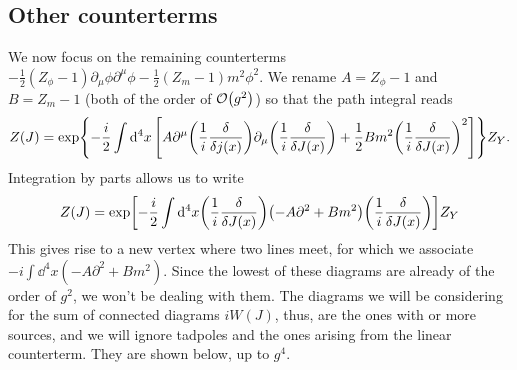 \subsection{Other counterterms}
We now focus on the remaining counterterms $-\frac{1}{2}(Z_\phi -1)\partial_\mu\phi\partial^\mu\phi-\frac{1}{2}(Z_m-1)m^2\phi^2$. We rename $A=Z_\phi-1$ and $B=Z_m-1$ (both of the order of $\order{g^2}$) so that the path integral reads
\begin{equation}
    Z(J)=\exp{-\frac{i}{2}\int\dd^4x\,\qty[A\partial^\mu\qty(\frac{1}{i}\fdv{j(x)})\partial_\mu\qty(\frac{1}{i}\fdv{J(x)})+\frac{1}{2}Bm^2\qty(\frac{1}{i}\fdv{J(x)})^2]}Z_Y.
\end{equation}
Integration by parts allows us to write
\begin{equation}
    Z(J)=\exp[-\frac{i}{2}\int\dd^4x\qty(\frac{1}{i}\fdv{J(x)})\qty(-A\partial^2+Bm^2)\qty(\frac{1}{i}\fdv{J(x)})]Z_Y
\end{equation}
This gives rise to a new vertex where two lines meet, for which we associate $-i\int\dd^4x(-A\partial^2+Bm^2)$. Since the lowest of these diagrams are already of the order of $g^2$, we won't be dealing with them. The diagrams we will be considering for the sum of connected diagrams $iW(J)$, thus, are the ones with or more sources, and we will ignore tadpoles and the ones arising from the linear counterterm. They are shown below, up to $g^4$. 
